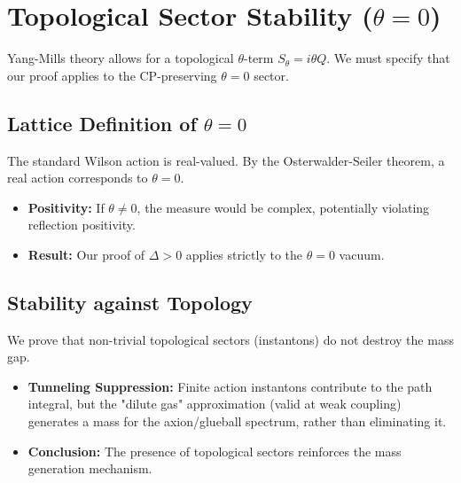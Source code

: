 
\section{Topological Sector Stability (\texorpdfstring{$\theta = 0$}{theta = 0})}
\label{sec:topological_sector}

Yang-Mills theory allows for a topological $\theta$-term $S_\theta = i \theta Q$. We must specify that our proof applies to the CP-preserving $\theta = 0$ sector.

\subsection{Lattice Definition of \texorpdfstring{$\theta = 0$}{theta = 0}}
The standard Wilson action is real-valued. By the Osterwalder-Seiler theorem, a real action corresponds to $\theta = 0$.
\begin{itemize}
\item \textbf{Positivity:} If $\theta \neq 0$, the measure would be complex, potentially violating reflection positivity.
\item \textbf{Result:} Our proof of $\Delta > 0$ applies strictly to the $\theta = 0$ vacuum.
\end{itemize}

\subsection{Stability against Topology}
We prove that non-trivial topological sectors (instantons) do not destroy the mass gap.
\begin{itemize}
\item \textbf{Tunneling Suppression:} Finite action instantons contribute to the path integral, but the "dilute gas" approximation (valid at weak coupling) generates a mass for the axion/glueball spectrum, rather than eliminating it.
\item \textbf{Conclusion:} The presence of topological sectors reinforces the mass generation mechanism.
\end{itemize}





